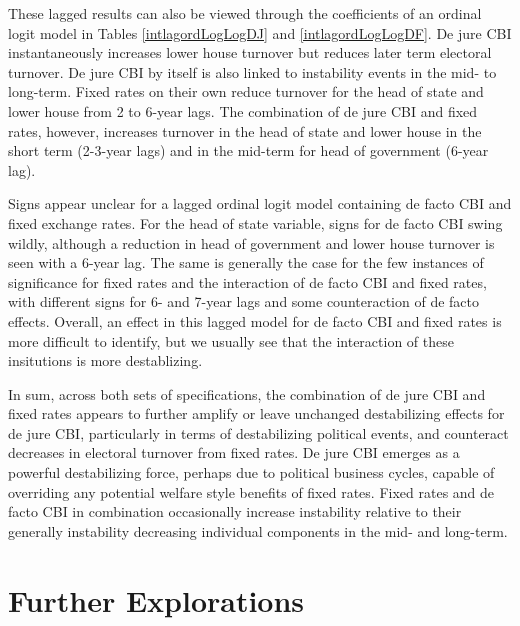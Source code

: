 \documentclass{article}
\begin{document}
    
    

    These lagged results can also be viewed through the coefficients of an ordinal logit model in Tables \ref*{intlagordLogLogDJ} and \ref*{intlagordLogLogDF}. De jure CBI instantaneously increases lower house turnover but reduces later term electoral turnover. De jure CBI by itself is also linked to instability events in the mid- to long-term. Fixed rates on their own reduce turnover for the head of state and lower house from 2 to 6-year lags. The combination of de jure CBI and fixed rates, however, increases turnover in the head of state and lower house in the short term (2-3-year lags) and in the mid-term for head of government (6-year lag).
    
    Signs appear unclear for a lagged ordinal logit model containing de facto CBI and fixed exchange rates. For the head of state variable, signs for de facto CBI swing wildly, although a reduction in head of government and lower house turnover is seen with a 6-year lag. The same is generally the case for the few instances of significance for fixed rates and the interaction of de facto CBI and fixed rates, with different signs for 6- and 7-year lags and some counteraction of de facto effects. Overall, an effect in this lagged model for de facto CBI and fixed rates is more difficult to identify, but we usually see that the interaction of these insitutions is more destablizing.

    

    

    In sum, across both sets of specifications, the combination of de jure CBI and fixed rates appears to further amplify or leave unchanged destabilizing effects for de jure CBI, particularly in terms of destabilizing political events, and counteract decreases in electoral turnover from fixed rates. De jure CBI emerges as a powerful destabilizing force, perhaps due to political business cycles, capable of overriding any potential welfare style benefits of fixed rates. Fixed rates and de facto CBI in combination occasionally increase instability relative to their generally instability decreasing individual components in the mid- and long-term. 

    \section*{Further Explorations}
\end{document}
